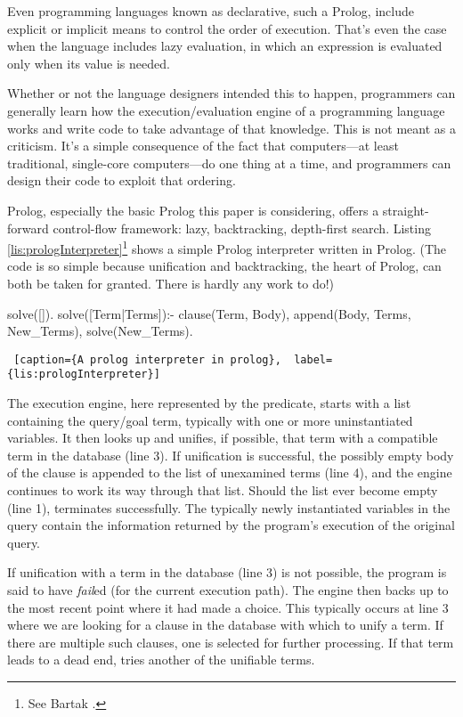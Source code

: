 Even programming languages known as declarative, such a Prolog, include explicit or implicit means to control the order of execution. That's even the case when the language includes lazy evaluation, in which an expression is evaluated only when its value is needed. 

Whether or not the language designers intended this to happen, programmers can generally learn how the execution/evaluation engine of a programming language works and write code to take advantage of that knowledge. This is not meant as a criticism. It's a simple consequence of the fact that computers---at least traditional, single-core computers---do one thing at a time, and programmers can design their code to exploit that ordering. 

Prolog, especially the basic Prolog this paper is considering, offers a straight-forward control-flow framework: lazy, backtracking, depth-first search. Listing \ref{lis:prologInterpreter}\footnote{See Bartak \cite{Bartak1998}.} shows a simple Prolog interpreter written in Prolog. (The code is so simple because unification and backtracking, the heart of Prolog, can both be taken for granted. There is hardly any work to do!)

\begin{minipage}{\linewidth}  \largev \hrulefill
\begin{python}[numbers=left]
solve([]).
solve([Term|Terms]):-
  clause(Term, Body), 
  append(Body, Terms, New_Terms), 
  solve(New_Terms).
\end{python}
\begin{lstlisting} [caption={A prolog interpreter in prolog},  label={lis:prologInterpreter}]
\end{lstlisting}
\end{minipage}

The execution engine, here represented by the  predicate, starts with a list containing the query/goal term, typically with one or more uninstantiated variables. It then looks up and unifies, if possible, that term with a compatible term in the database (line 3). If unification is successful, the possibly empty body of the clause is appended to the list of unexamined terms (line 4), and the engine continues to work its way through that list. Should the list ever become empty (line 1),  terminates successfully. The typically newly instantiated variables in the query contain the information returned by the program's execution of the original query.

If unification with a term in the database (line 3) is not possible, the program is said to have \textit{fail}ed (for the current execution path). The engine then backs up to the most recent point where it had made a choice. This typically occurs at line 3 where we are looking for a clause in the database with which to unify a term. If there are multiple such clauses, one is selected for further processing. If that term leads to a dead end,  tries another of the unifiable terms.

